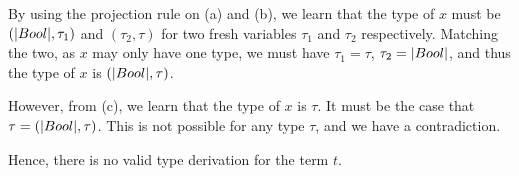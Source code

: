 \begin{exercise}{}
\begin{solution}
\begin{enumerate}
      By using the projection rule on (a) and (b), we learn that the type of
      \(x\) must be \((\lstinline|Bool|, \tau_1)\) and \((\tau_2, \tau)\) for
      two fresh variables \(\tau_1\) and \(\tau_2\) respectively. Matching the
      two, as \(x\) may only have one type, we must have \(\tau_1 = \tau\),
      \(\tau_2 = \lstinline|Bool|\), and thus the type of \(x\) is
      \((\lstinline|Bool|, \tau)\).

      However, from (c), we learn that the type of \(x\) is \(\tau\). It must be
      the case that \(\tau = (\lstinline|Bool|, \tau)\). This is not possible
      for any type \(\tau\), and we have a contradiction.

      Hence, there is no valid type derivation for the term \(t\).
    \end{enumerate}
    
  \end{solution}

\end{exercise}

